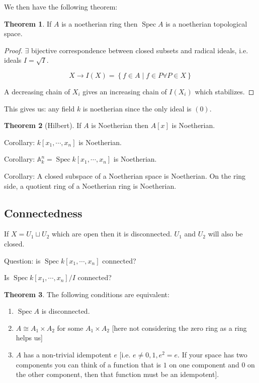 \documentclass{article}
\theoremstyle{definition}
\newtheorem{theorem}{Theorem}
\begin{document}
    We then have the following theorem:

    \begin{theorem}
        If \(A\) is a noetherian ring then \(\operatorname{Spec} A\) is a noetherian topological space.
    \end{theorem}

    \begin{proof}
        \(\exists\) bijective correspondence between closed subsets and radical ideals, i.e. ideals \(I = \sqrt{I}\). 

        \[
            X \to I(X) = \left\{ f\in A \mid f\in P \forall P \in X \right\}
        \]

        A decreasing chain of \(X_i\) gives an increasing chain of \(I(X_i)\) which stabilizes.
    \end{proof}

    This gives us: any field \(k\) is noetherian since the only ideal is \((0)\).

    \begin{theorem}
        [Hilbert] If \(A\) is Noetherian then \(A[x]\) is Noetherian.
    \end{theorem}

    Corollary: \(k[x_1, \cdots , x_n]\) is Noetherian.

    Corollary: \(\mathbb{A}^n_k = \operatorname{Spec} k[x_1, \cdots , x_n]\) is Noetherian.

    Corollary: A closed subspace of a Noetherian space is Noetherian. On the ring side, a quotient ring of a Noetherian ring is Noetherian.

    \subsection*{Connectedness}

    If \(X = U_1 \sqcup U_2\) which are open then it is disconnected. \(U_1\) and \(U_2\) will also be closed.

    Question: is \(\operatorname{Spec} k[x_1, \cdots , x_n]\) connected?

    Is \(\operatorname{Spec} k[x_1, \cdots , x_n] / I\) connected?
    
    \begin{theorem}
        The following conditions are equivalent:

        \begin{enumerate}[label=\arabic*)]
            \item \(\operatorname{Spec} A\) is disconnected.
            \item \(A \cong A_1 \times A_2\) for some \(A_1 \times A_2\) [here not considering the zero ring as a ring helps us]
            \item \(A\) has a non-trivial idempotent \(e\) [i.e. \(e\neq 0,1, e^2 = e\). If your space has two components you can think of a function that is \(1\) on one component and \(0\) on the other component, then that function must be an idempotent].
        \end{enumerate} 
    \end{theorem}
\end{document}
